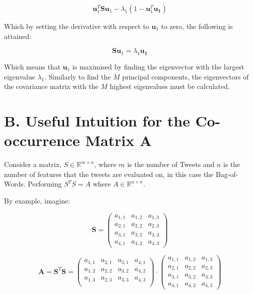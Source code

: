 \documentclass[11pt,a4paper]{article}
\newcommand{\smat}{\mathbf{S}}
\newcommand{\covmat}{\mathbf{A}}
\begin{document}
\begin{equation*}
\mathbf{u}_1^T \mathbf{S} \mathbf{u}_1 - \lambda_1 (1 - \mathbf{u}_1^T \mathbf{u_1})
\label{lagrange_uSu}
\end{equation*} 

Which by setting the derivative with respect to $\mathbf{u}_1$ to zero, the following is attained:


\begin{equation*}
\mathbf{S} \mathbf{u}_1 = \lambda_1  \mathbf{u_1}
\label{eig_uSu}
\end{equation*} 

Which means that $\mathbf{u}_1$ is maximised by finding the eigenvector with the largest eigenvalue $\lambda_1$. Similarly to find the $M$ principal components, the eigenvectors of the covariance matrix with the $M$ highest eigenvalues must be calculated.
\clearpage
\section*{B. Useful Intuition for the Co-occurrence Matrix $\mathbf{A}$}
Consider a matrix, $S\in \mathbb{R}^{m\times n}$, where $m$ is the number of Tweets and $n$ is the number of features that the tweets are evaluated on, in this case the Bag-of-Words. Performing $S^TS = A$ where $A \in \mathbb{R}^{n\times n}$. 

By example, imagine:

\begin{equation}
\smat = \left( \begin{matrix}
a_{1, 1} & a_{1, 2} & a_{1, 3} \\ 
a_{2, 1} & a_{2, 2} & a_{2, 3} \\
a_{3, 1} & a_{3, 2} & a_{3, 3} \\
a_{4, 1} & a_{4, 2} & a_{4, 3} 
\end{matrix} \right)
\end{equation}

\begin{equation}
\covmat = \smat^T\smat =
 \left( \begin{matrix}
a_{1, 1} & a_{2, 1} & a_{3, 1} & a_{4, 1} \\ 
a_{1, 2} & a_{2, 2} & a_{3, 2} & a_{4, 2} \\ 
a_{1, 3} & a_{2, 3} & a_{3, 3} & a_{4, 3} \\ 

\end{matrix} \right)
\cdot \left( \begin{matrix}
a_{1, 1} & a_{1, 2} & a_{1, 3} \\ 
a_{2, 1} & a_{2, 2} & a_{2, 3} \\
a_{3, 1} & a_{3, 2} & a_{3, 3} \\
a_{4, 1} & a_{4, 2} & a_{4, 3} 
\end{matrix} \right)
\end{equation}
\end{document}
